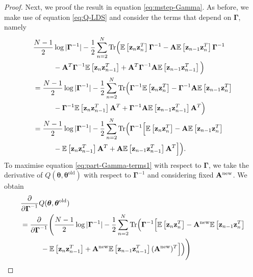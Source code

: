 \documentclass[11pt]{article}
\numberwithin{equation}{section}
\newcommand{\expectation}[1]{\mathbb{E}\left[#1\right]}
\newcommand{\z}{{\bf z}}
\begin{document}
\begin{proof}
	Next, we proof the result in equation \eqref{eq:mstep-Gamma}. As before, we make use of equation \eqref{eq:Q-LDS} and consider the terms that depend on $\boldsymbol{\Gamma}$, namely
	\begin{align}
		& \frac{N-1}{2}\log\vert\boldsymbol\Gamma^{-1}\vert -\frac{1}{2}\sum_{n=2}^N\text{Tr}\Big(\expectation{\z_n\z_n^T}\boldsymbol\Gamma^{-1} - {\bf A}\expectation{\z_{n-1}\z_n^T}\boldsymbol\Gamma^{-1} \nonumber\\
		&\hspace{1cm} - {\bf A}^T\boldsymbol{\Gamma}^{-1} \expectation{\z_n\z_{n-1}^T} + {\bf A}^T\boldsymbol\Gamma^{-1}{\bf A} \expectation{\z_{n-1}\z_{n-1}^T}\Big) \nonumber\\
		&= \frac{N-1}{2}\log\vert\boldsymbol\Gamma^{-1}\vert -\frac{1}{2}\sum_{n=2}^N\text{Tr}\Big( \boldsymbol{\Gamma}^{-1}\expectation{\z_n\z_n^T} - \boldsymbol{\Gamma}^{-1}{\bf A}\expectation{\z_{n-1}\z_n^T} \nonumber \\
		&\hspace{1cm} -\boldsymbol{\Gamma}^{-1}\expectation{\z_{n}\z_{n-1}^T}{\bf A}^T + \boldsymbol{\Gamma}^{-1} {\bf A}\expectation{\z_{n-1}\z_{n-1}^T}{\bf A}^T\Big) \nonumber\\
		&= \frac{N-1}{2}\log\vert\boldsymbol\Gamma^{-1}\vert -\frac{1}{2}\sum_{n=2}^N\text{Tr}\Big(\boldsymbol{\Gamma}^{-1}\Big[\expectation{\z_n\z_n^T} - {\bf A}\expectation{\z_{n-1}\z_n^T} \nonumber \\
		&\hspace{1cm} -\expectation{\z_n\z_{n-1}^T}{\bf A}^T + {\bf A}\expectation{\z_{n-1}\z_{n-1}^T}{\bf A}^T \Big]\Big) \label{eq:part-Gamma-terms1}.
	\end{align}
	To maximise equation \eqref{eq:part-Gamma-terms1} with respect to $\boldsymbol{\Gamma}$, we take the derivative of $Q(\boldsymbol\theta, \boldsymbol\theta^\text{old})$ with respect to $\boldsymbol{\Gamma}^{-1}$ and considering fixed ${\bf A}^{\text{new}}$. We obtain
	\begin{align}
		&\frac{\partial}{\partial \boldsymbol{\Gamma}^{-1}}Q(\boldsymbol\theta, \boldsymbol\theta^{\text{old}}) \\
		&= \frac{\partial}{\partial \boldsymbol{\Gamma}^{-1}}\Bigg(\frac{N-1}{2}\log\vert\boldsymbol\Gamma^{-1}\vert -\frac{1}{2}\sum_{n=2}^N\text{Tr}\Big(\boldsymbol{\Gamma}^{-1}\Big[\expectation{\z_n\z_n^T} - {\bf A}^{\text{new}}\expectation{\z_{n-1}\z_n^T} \nonumber \\
		&\hspace{1cm} -\expectation{\z_n\z_{n-1}^T} + {\bf A}^{\text{new}}\expectation{\z_{n-1}\z_{n-1}^T}({\bf A}^{\text{new}})^T \Big]\Big)\Bigg) \\

\end{align}
\end{proof}
\end{document}
